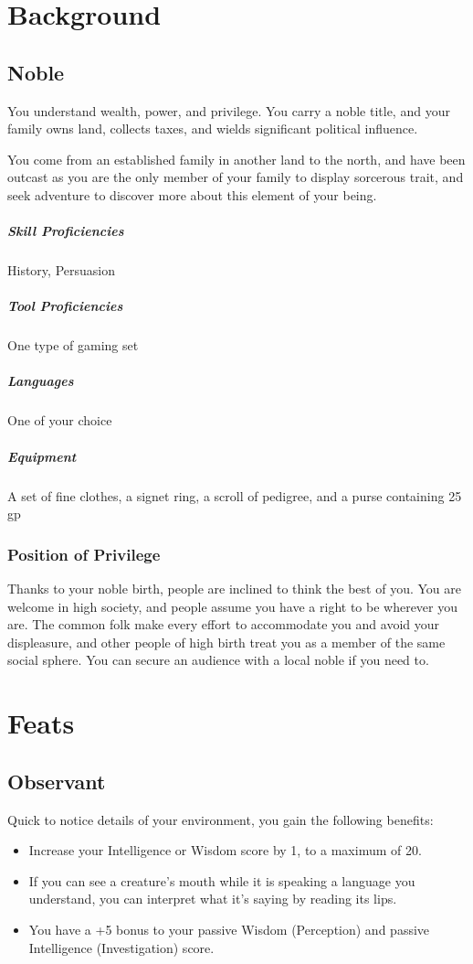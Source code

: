 \documentclass[a4paper,openany,twocolumn]{book}
\begin{document}
\section*{Background}
\subsection*{Noble}
You understand wealth, power, and privilege. You carry a noble title, and your family owns land, collects taxes, and wields significant political influence.

You come from an established family in another land to the north, and have been outcast as you are the only member of your family to display sorcerous trait, and seek adventure to discover more about this element of your being.

\subparagraph*{Skill Proficiencies} History, Persuasion
\subparagraph*{Tool Proficiencies} One type of gaming set
\subparagraph*{Languages} One of your choice
\subparagraph*{Equipment} A set of fine clothes, a signet ring, a scroll of pedigree, and a purse containing 25 gp

\subsubsection*{Position of Privilege}
Thanks to your noble birth, people are inclined to think the best of you. You are welcome in high society, and people assume you have a right to be wherever you are. The common folk make every effort to accommodate you and avoid your displeasure, and other people of high birth treat you as a member of the same social sphere. You can secure an audience with a local noble if you need to.


\section*{Feats}
\subsection*{Observant}
Quick to notice details of your environment, you gain the following benefits:
\begin{itemize}
  \item Increase your Intelligence or Wisdom score by 1, to a maximum of 20.
  \item If you can see a creature's mouth while it is speaking a language you understand, you can interpret what it's saying by reading its lips.
  \item You have a +5 bonus to your passive Wisdom (Perception) and passive Intelligence (Investigation) score.
\end{itemize}
\end{document}

